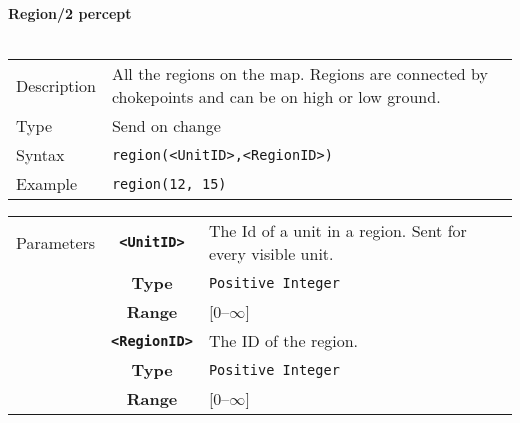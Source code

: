 \noindent
\textbf{Region/2 percept}\\
\\
\begin{tabularx}{\textwidth}{lX}
 Description & All the regions on the map. Regions are connected by chokepoints and can be on high or low ground. \\
 Type & Send on change \\
 Syntax & \verb|region(<UnitID>,<RegionID>)| \\
 Example & \verb|region(12, 15)| \\
 \end{tabularx}
 \begin{tabularx}{\textwidth}{l | c | p{8cm}|}
 \cline{2-3}
 Parameters & \textbf{\verb|<UnitID>|} & The Id of a unit in a region. Sent for every visible unit.\\
            & \textbf{Type} & \verb|Positive Integer| \\
            & \textbf{Range} & [0--$\infty$] \\
            \cline{2-3}
            & \textbf{\verb|<RegionID>|} & The ID of the region.\\
            & \textbf{Type} & \verb|Positive Integer| \\
            & \textbf{Range} & [0--$\infty$] \\
            \cline{2-3}
            
\end{tabularx}\\


